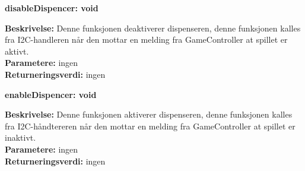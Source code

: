 \documentclass[Arkitektur/System_main.tex]{subfiles}
\begin{document}
\textbf {disableDispencer: void}
\begin{adjustwidth}{1cm}{0pt}
\textbf {Beskrivelse:} Denne funksjonen deaktiverer dispenseren, denne funksjonen kalles fra I2C-handleren når den mottar en melding fra GameController at spillet er aktivt. \\ [0.2cm]
\textbf {Parametere:} ingen \\ [0.2cm]
\textbf {Returneringsverdi:} ingen \\ [0.2cm]
\end{adjustwidth}

\textbf {enableDispencer: void}
\begin{adjustwidth}{1cm}{0pt}
\textbf {Beskrivelse:} Denne funksjonen aktiverer dispenseren, denne funksjonen kalles fra I2C-håndtereren når den mottar en melding fra GameController at spillet er inaktivt. \\ [0.2cm]
\textbf {Parametere:} ingen \\ [0.2cm]
\textbf {Returneringsverdi:} ingen \\ [0.2cm]
\end{adjustwidth}
\end{document}
